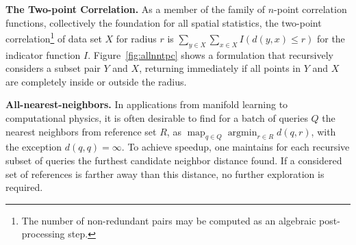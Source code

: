 \documentclass{article}
\DeclareMathOperator*{\argmin}{argmin}
\DeclareMathOperator*{\map}{map}
\newcommand{\fig}[1]{Figure~\ref{fig:#1}}
\newcommand{\spos}{^{{\scriptscriptstyle +\!}}}
\newcommand{\sneg}{^{{\scriptscriptstyle -\!}}}
\begin{document}
{\bf The Two-point Correlation.} As a member of the family of $n$-point correlation functions, collectively the foundation for all spatial statistics, the two-point correlation\footnote{The number of non-redundant pairs may be computed as an algebraic post-processing step.} of data set $X$ for radius $r$ is
$\sum_{y \in X} \sum_{x \in X} I(d(y, x) \leq r)$ for the indicator function $I$.
\fig{allnntpc} shows a formulation that recursively considers a subset pair $Y$ and $X$, returning immediately if all points in $Y$ and $X$ are completely inside or outside the radius.

{\bf All-nearest-neighbors.} In applications from manifold learning to computational physics, it is often desirable to find for a batch of queries $Q$ the nearest neighbors from reference set $R$, as $\map_{q \in Q} \argmin_{r \in R} d(q,r)$, with the exception $d(q,q) = \infty$.
To achieve speedup, one maintains for each recursive subset of queries the furthest candidate neighbor distance found.
If a considered set of references is farther away than this distance, no further exploration is required.

\end{document}
